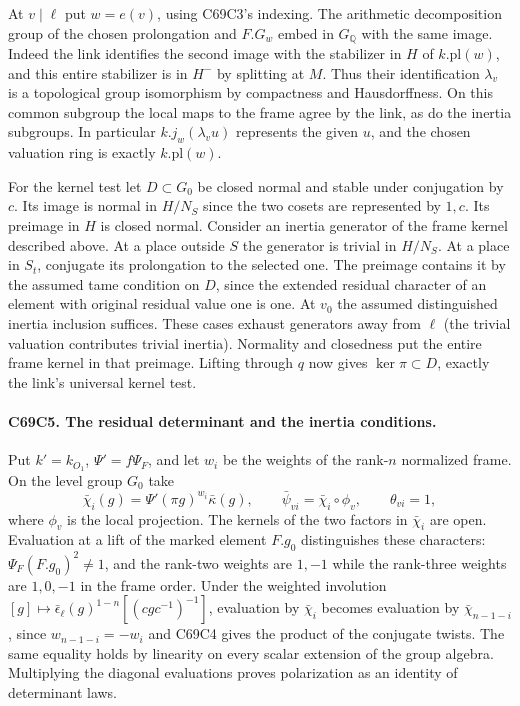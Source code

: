 At $v\mid\ell$ put $w=e(v)$, using C69C3's indexing. The arithmetic
decomposition group of the chosen prolongation and $F.G_w$ embed in
$G_{\mathbb Q}$ with the same image. Indeed the link identifies the
second image with the stabilizer in $H$ of $k.\mathrm{pl}(w)$, and
this entire stabilizer is in $H^-$ by splitting at $M$. Thus their
identification $\lambda_v$ is a topological group isomorphism by
compactness and Hausdorffness. On this common subgroup the local
maps to the frame agree by the link, as do the inertia subgroups.
In particular $k.j_w(\lambda_v u)$ represents the given $u$, and
the chosen valuation ring is exactly $k.\mathrm{pl}(w)$.

For the kernel test let $D\subset G_0$ be closed normal and stable
under conjugation by $c$. Its image is normal in $H/N_S$ since the
two cosets are represented by $1,c$. Its preimage in $H$ is closed
normal. Consider an inertia generator of the frame kernel described
above. At a place outside $S$ the generator is trivial in $H/N_S$.
At a place in $S_t$, conjugate its prolongation to the selected one.
The preimage contains it by the assumed tame condition on $D$, since
the extended residual character of an element with original residual
value one is one. At $v_0$ the assumed distinguished inertia inclusion
suffices. These cases exhaust generators away from $\ell$ (the trivial
valuation contributes trivial inertia). Normality and closedness put
the entire frame kernel in that preimage. Lifting through $q$ now
gives $\ker\pi\subset D$, exactly the link's universal kernel test.

\paragraph{C69C5. The residual determinant and the inertia conditions.}
Put $k'=k_{O_1}$, $\Psi'=f\Psi_F$, and let $w_i$ be the weights of
the rank-$n$ normalized frame. On the level group $G_0$ take
\[
 \bar\chi_i(g)=\Psi'(\pi g)^{w_i}\bar\kappa(g),\qquad
 \bar\psi_{vi}=\bar\chi_i\circ\phi_v,\qquad \theta_{vi}=1 ,
\]
where $\phi_v$ is the local projection. The kernels of the two
factors in $\bar\chi_i$ are open. Evaluation at a lift of the marked
element $F.g_0$ distinguishes these characters: $\Psi_F(F.g_0)^2
\ne1$, and the rank-two weights are $1,-1$ while the rank-three
weights are $1,0,-1$ in the frame order.
Under the weighted involution $[g]\mapsto
\bar\epsilon_\ell(g)^{1-n}[(cgc^{-1})^{-1}]$, evaluation by
$\bar\chi_i$ becomes evaluation by $\bar\chi_{n-1-i}$, since
$w_{n-1-i}=-w_i$ and C69C4 gives the product of the conjugate twists.
The same equality holds by linearity on every scalar extension of
the group algebra. Multiplying the diagonal evaluations proves
polarization as an identity of determinant laws.


